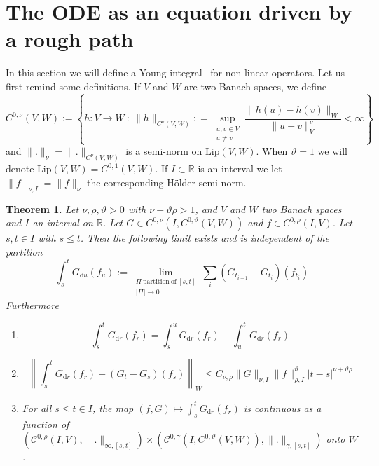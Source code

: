 \documentclass[11pt,a4paper,draft,reqno]{amsart}
\newtheorem{theorem}{Theorem}
\theoremstyle{definition}
\newcommand{\RR}{\mathbb{R}}
\newcommand{\dd}{\mathrm{d}}
\newcommand{\cC}{\mathcal{C}}
\begin{document}
\section{The ODE as an equation driven by a rough path}
\label{sec:young-ode}

In this section we will define a Young integral~\cites{Young,Lyons} for non linear operators. Let us first remind some definitions. If $V$ and $W$ are two Banach spaces, we define 
$$C^{0,\nu}(V,W):=\left\{h:V\to W\ : \ \|h\|_{C^\nu(V, W)} : = \sup_{\substack{u,v\in V \\ u\neq v}}\frac{\|h(u)-h(v)\|_W}{\|u-v\|^\nu_V} < \infty \right\}$$
and $\|.\|_{\nu}=\|.\|_{C^\nu(V,W)}$ is a semi-norm on $\mathrm{Lip}(V,W)$. When $\vartheta=1$ we will denote $\mathrm{Lip}(V,W) = C^{0,1}(V,W)$. If $I\subset \RR$ is an interval we let $\|f\|_{\nu,I} = \|f\|_{\nu}$ the corresponding H\"older semi-norm.  

\begin{theorem}\label{young integral}
Let $\nu,\rho,\vartheta >0$  with $\nu+\vartheta\rho>1$, and $V$ and $W$ two Banach spaces and $I$ an interval on $\RR$. Let $G\in C^{0,\nu}\left(I, C^{0,\vartheta}(V,W)\right)$ and $f\in C^{0,\rho}(I,V)$. Let $ s,t \in I$ with $s\le t$. Then the following limit exists and is independent of the partition
$$\int_s^t G_{\dd u}(f_u) := \lim_{\substack{\Pi \mathrm{\ partition\ of}\ [s,t]\\ |\Pi|\to 0}} \sum_{i}(G_{t_{i+1}}-G_{t_i})(f_{t_i}) $$
Furthermore
\begin{enumerate}
\item
$$\int_s^tG_{\dd r}(f_r)=\int_s^u G_{\dd r}(f_r)+\int_u^t G_{\dd r}(f_r)$$
\item
$$\left\|\int_s^t G_{\dd r}(f_r) - (G_t-G_s)(f_s)\right\|_W 
\le 
C_{\nu,\rho} \|G\|_{\nu,I} \|f\|_{\rho,I}^\vartheta |t-s|^{\nu+\vartheta\rho} $$
\item For all $s\le t \in I$, the map $(f,G) \mapsto  \int_s^t G_{\dd r}(f_r)$ is continuous as a function of $\left(\cC^{0,\rho}(I,V),\|.\|_{\infty,[s,t]}\right)\times\left(\cC^{0,\gamma}\left(I,C^{0,\vartheta}(V,W)\right),\|.\|_{\gamma,[s,t]} \right)$ onto $W$.
\end{enumerate}
\end{theorem}
\end{document}
